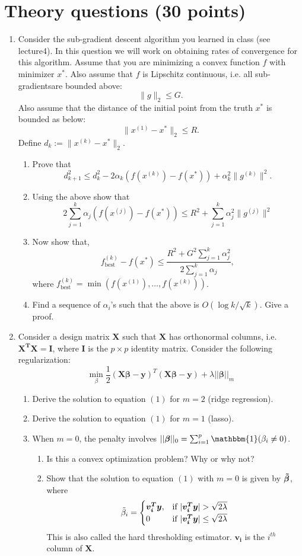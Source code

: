 \documentclass[12pt]{article}
\newcommand{\bm}[1]{\boldsymbol{#1}}
\newcommand{\bi}{\begin{enumerate}}
\newcommand{\ib}{\end{enumerate}}
\newcommand{\p}{\item}
\newcommand{\sgs}{sub-gradients}
\newcommand{\xk}{x^{(k)}}
\begin{document}
	\section{Theory questions (30 points)}
	\bi
	\p Consider the sub-gradient descent algorithm you learned in class (see lecture4). In this question we will work on obtaining rates of convergence for this algorithm. Assume that you are minimizing a convex function $f$ with minimizer $x^*$. Also assume that $f$ is Lipschitz continuous, i.e. all \sgs are bounded above:
	$$\|g\|_2\leq G.$$
	Also assume that the distance of the initial point from the truth $x^*$ is bounded as below:
	$$\|x^{(1)}-x^*\|_2\leq R.$$
	Define  $d_k:=\|x^{(k)}-x^*\|_2$. 
	\bi
	\p Prove that $$d_{k+1}^2\leq d_k^2-2\alpha_k(f(\xk)-f(x^*))+\alpha_k^2\|g^{(k)}\|^2.$$
	\p Using the above show that
	$$2\sum_{j=1}^k\alpha_j(f(x^{(j)})-f(x^*))\leq R^2+\sum_{j=1}^k \alpha_j^2\|g^{(j)}\|^2$$
	\p Now show that, 
	$$f^{(k)}_{\text{best}}-f(x^*)\leq \frac{R^2+G^2\sum_{j=1}^k\alpha_j^2}{2\sum_{j=1}^k\alpha_j},$$
	where $f^{(k)}_{\text{best}}=\min(f(x^{(1)}),\dots,f(x^{(k)}))$.\p Find a sequence of $\alpha_i$'s such that the above is $O(\log k/\sqrt{k})$. Give a proof.
	\ib
	
	\p Consider a design matrix $\bm{X}$ such that $\bm{X}$ has orthonormal columns, i.e.
$\bm{X^T X} = \bm{I}$, where $\bm{I}$ is the $p \times p$ identity matrix. Consider the following regularization:
\begin{equation}
    \underset{\beta}{\min}\frac{1}{2}(\bm{X\beta-y})^T(\bm{X\beta-y})+\lambda||\bm{\beta}||_m
\end{equation} %

    \bi
    \p Derive the solution to equation $(1)$ for $m=2$ (ridge regression).
    \p Derive the solution to equation $(1)$ for $m=1$ (lasso).
    \p When $m=0$, the penalty involves $||\bm{\bm{\beta}}||_0 = \sum_{i=1}^p \mathbbm{1}(\beta_i\neq 0)$. 
    \bi
    \p Is this a convex optimization problem? Why or why not?
    \p Show that the solution to equation $(1)$ with $m=0$ is given by $\bm{\Tilde{\beta}}$, where
    \[
    \Tilde{\beta}_i = 
    \begin{cases}
        \bm{v_i^T y},& \text{if } |\bm{v_i^T y}|>\sqrt{2\lambda}\\
        0            & \text{if } |\bm{v_i^T y}|\leq\sqrt{2\lambda}
    \end{cases}
    \]
    This is also called the hard thresholding estimator. $\bm{v_i}$ is the $i^{th}$ column of $\bm{X}$.
\ib
    \ib

\ib	

	
	\newpage
	
	
\end{document}
